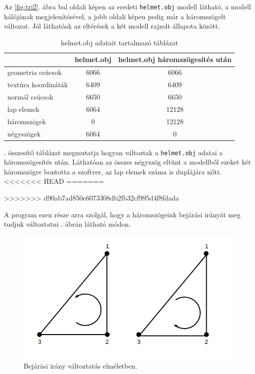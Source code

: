 Az \ref{fig:tri2}. ábra bal oldali képen az eredeti \texttt{helmet.obj} modell látható, a modell hálójának megjelenítésével, a jobb oldali képen pedig már a háromszögelt változat. Jól láthatóak az eltérések a két modell rajzolt állapota között.

\begin{table}[h]
\centering
\caption{helmet.obj adatait tartalmazó táblázat}
\bigskip
\label{tab:modellek}
\begin{tabular}{l|c|c|}
& helmet.obj & helmet.obj háromszögesítés után \\
\hline
geometria csúcsok & 6066 & 6066 \\
textúra koordináták & 6409 & 6409 \\
normál csúcsok & 6650 & 6650 \\
lap elemek & 6064 & 12128 \\
háromszögek & 0 & 12128 \\
négyszögek & 6064 & 0 \\
\hline
\end{tabular}
\label{fig:tri3}
\end{table}

. összesítő táblázat megmutatja hogyan változtak a \texttt{helmet.obj} adatai a háromszögesítés után. Láthatóan az összes négyszög eltünt a modellből ezeket két háromszögre bontotta a szoftver, az lap elemek száma is duplájára nőtt.
<<<<<<< HEAD
\newpage
=======

>>>>>>> d90ab7ad850e6073308db2fb32cf995d4f8fdada

A program ezen része arra szolgál, hogy a háromszögeink bejárási irányát meg tudjuk változtatni . ábrán látható módon.

\begin{figure}[h]
\centering
\includegraphics[scale=0.5]{images/bejarasi.png}
\caption{Bejárási irány változtatás elméletben.}
\label{fig:bej1}
\end{figure}


